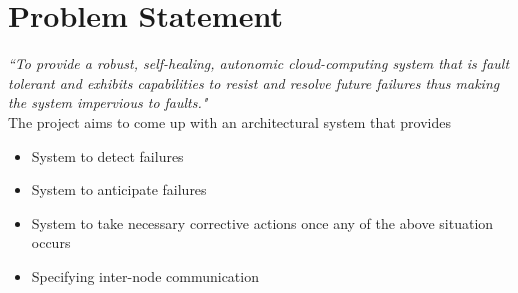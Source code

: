 
\chapter{Problem Statement}
\textit {``To provide a robust, self-healing, autonomic cloud-computing system that is fault tolerant and exhibits capabilities to resist and resolve future failures thus making the system impervious to faults."\\}
The project aims to come up with an architectural system that provides
	\begin{itemize}
		\item System to detect failures
		\item System to anticipate failures
		\item System to take necessary corrective actions once any of the above situation occurs
		\item Specifying inter-node communication
	\end{itemize}
